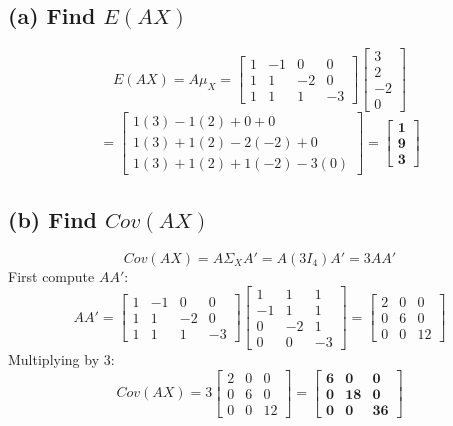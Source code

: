 \documentclass[11pt]{article}
\begin{document}
\subsection*{(a) Find $E(AX)$}
\[
E(AX) = A \mu_X = \begin{bmatrix} 1 & -1 & 0 & 0 \\ 1 & 1 & -2 & 0 \\ 1 & 1 & 1 & -3 \end{bmatrix} \begin{bmatrix} 3 \\ 2 \\ -2 \\ 0 \end{bmatrix}
\]
\[
= \begin{bmatrix} 1(3) - 1(2) + 0 + 0 \\ 1(3) + 1(2) - 2(-2) + 0 \\ 1(3) + 1(2) + 1(-2) - 3(0) \end{bmatrix}
= \mathbf{\begin{bmatrix} 1 \\ 9 \\ 3 \end{bmatrix}}
\]

\subsection*{(b) Find $Cov(AX)$}
\[
Cov(AX) = A \Sigma_X A' = A (3I_4) A' = 3 A A'
\]
First compute $AA'$:
\[
A A' = \begin{bmatrix} 1 & -1 & 0 & 0 \\ 1 & 1 & -2 & 0 \\ 1 & 1 & 1 & -3 \end{bmatrix} \begin{bmatrix} 1 & 1 & 1 \\ -1 & 1 & 1 \\ 0 & -2 & 1 \\ 0 & 0 & -3 \end{bmatrix}
= \begin{bmatrix} 2 & 0 & 0 \\ 0 & 6 & 0 \\ 0 & 0 & 12 \end{bmatrix}
\]
Multiplying by 3:
\[
Cov(AX) = 3 \begin{bmatrix} 2 & 0 & 0 \\ 0 & 6 & 0 \\ 0 & 0 & 12 \end{bmatrix} = \mathbf{\begin{bmatrix} 6 & 0 & 0 \\ 0 & 18 & 0 \\ 0 & 0 & 36 \end{bmatrix}}
\]
\end{document}
